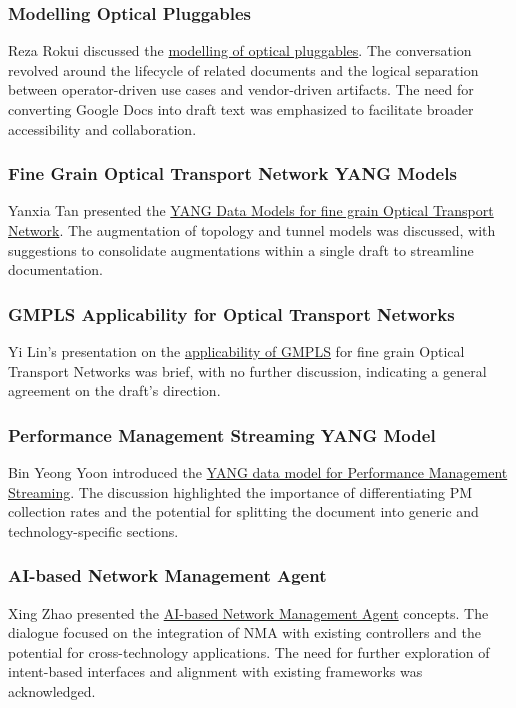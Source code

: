 \documentclass{article}
\begin{document}
\subsubsection{Modelling Optical Pluggables}
Reza Rokui discussed the \href{https://datatracker.ietf.org/doc/html/draft-rokui-ccamp-actn-wdm-pluggable-modelling}{modelling of optical pluggables}. The conversation revolved around the lifecycle of related documents and the logical separation between operator-driven use cases and vendor-driven artifacts. The need for converting Google Docs into draft text was emphasized to facilitate broader accessibility and collaboration.

\subsubsection{Fine Grain Optical Transport Network YANG Models}
Yanxia Tan presented the \href{https://datatracker.ietf.org/doc/html/draft-tan-ccamp-fgotn-yang}{YANG Data Models for fine grain Optical Transport Network}. The augmentation of topology and tunnel models was discussed, with suggestions to consolidate augmentations within a single draft to streamline documentation.

\subsubsection{GMPLS Applicability for Optical Transport Networks}
Yi Lin's presentation on the \href{https://datatracker.ietf.org/doc/html/draft-lin-ccamp-gmpls-fgotn-applicability}{applicability of GMPLS} for fine grain Optical Transport Networks was brief, with no further discussion, indicating a general agreement on the draft's direction.

\subsubsection{Performance Management Streaming YANG Model}
Bin Yeong Yoon introduced the \href{https://datatracker.ietf.org/doc/html/draft-yoon-ccamp-pm-streaming}{YANG data model for Performance Management Streaming}. The discussion highlighted the importance of differentiating PM collection rates and the potential for splitting the document into generic and technology-specific sections.

\subsubsection{AI-based Network Management Agent}
Xing Zhao presented the \href{https://datatracker.ietf.org/doc/html/draft-zhao-nmop-network-management-agent}{AI-based Network Management Agent} concepts. The dialogue focused on the integration of NMA with existing controllers and the potential for cross-technology applications. The need for further exploration of intent-based interfaces and alignment with existing frameworks was acknowledged.
\end{document}
